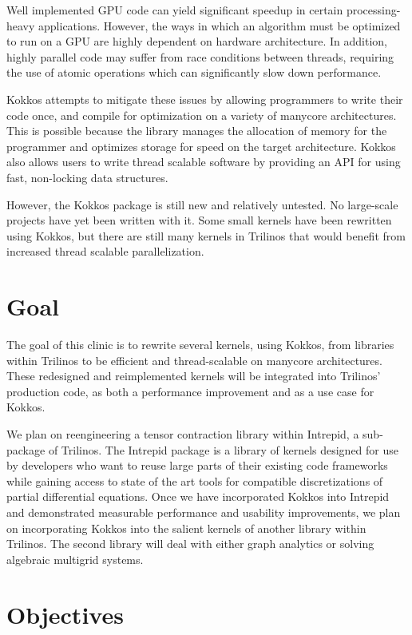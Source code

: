 \documentclass[proposal]{hmcclinic}
\begin{document}
Well implemented GPU code can yield significant speedup in certain
processing-heavy applications.  However, the ways in which an algorithm must be
optimized to run on a GPU are highly dependent on hardware architecture.  In
addition, highly parallel code may suffer from race conditions between threads,
requiring the use of atomic operations which can significantly slow down performance.

Kokkos attempts to mitigate these issues by allowing programmers to write their
code once, and compile for optimization on a variety of manycore architectures.
This is possible because the library manages the allocation of memory for the
programmer and optimizes storage for speed on the target architecture. Kokkos
also allows users to write thread scalable software by providing an API for
using fast, non-locking data structures.

However, the Kokkos package is still new and relatively untested.  No
large-scale projects have yet been written with it.  Some small kernels have
been rewritten using Kokkos, but there are still many kernels in Trilinos that
would benefit from increased thread scalable parallelization.


\section{Goal}

The goal of this clinic is to rewrite several kernels, using Kokkos, from libraries within
Trilinos to be efficient and thread-scalable on manycore architectures.  
These redesigned and reimplemented kernels will be integrated into
Trilinos' production code, as both a performance improvement and as a use case
for Kokkos.

We plan on reengineering a tensor contraction library within Intrepid, a sub-package of Trilinos. 
The Intrepid package is
a library of kernels designed for use by developers who want to reuse large
parts of their existing code frameworks while gaining access to state of the art
tools for compatible discretizations of partial differential equations. Once we
have incorporated Kokkos into Intrepid and demonstrated measurable performance
and usability improvements, we plan on incorporating Kokkos into the salient
kernels of another library within Trilinos.  The second library will deal with
either graph analytics or solving algebraic multigrid systems.
\section{Objectives}
\end{document}
